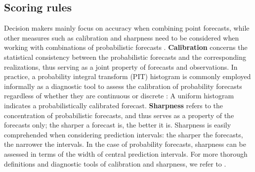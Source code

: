 \documentclass[11pt]{article}
\begin{document}

\subsection{Scoring rules}
\label{sec:issues}

Decision makers mainly focus on accuracy when combining point forecasts, while other measures such as calibration and sharpness need to be considered when working with combinations of probabilistic forecasts \citep{Gneiting2007-fr,Gneiting2007-ij,Lahiri2015-qq}. \textbf{Calibration} concerns the statistical consistency between the probabilistic forecasts and the corresponding realizations, thus serving as a joint property of forecasts and observations. In practice, a probability integral transform (PIT) histogram is commonly employed informally as a diagnostic tool to assess the calibration of probability forecasts regardless of whether they are continuous \citep{Dawid1984-vp,Diebold1997-cr} or discrete \citep{Gneiting2013-hl}: A uniform histogram indicates a probabilistically calibrated forecast. \textbf{Sharpness} refers to the concentration of probabilistic forecasts, and thus serves as a property of the forecasts only; the sharper a forecast is, the better it is. Sharpness is easily comprehended when considering prediction intervals: the sharper the forecasts, the narrower the intervals. In the case of probability forecasts, sharpness can be assessed in terms of the width of central prediction intervals. For more thorough definitions and diagnostic tools of calibration and sharpness, we refer to \citet{Gneiting2014-tz}.
\end{document}
